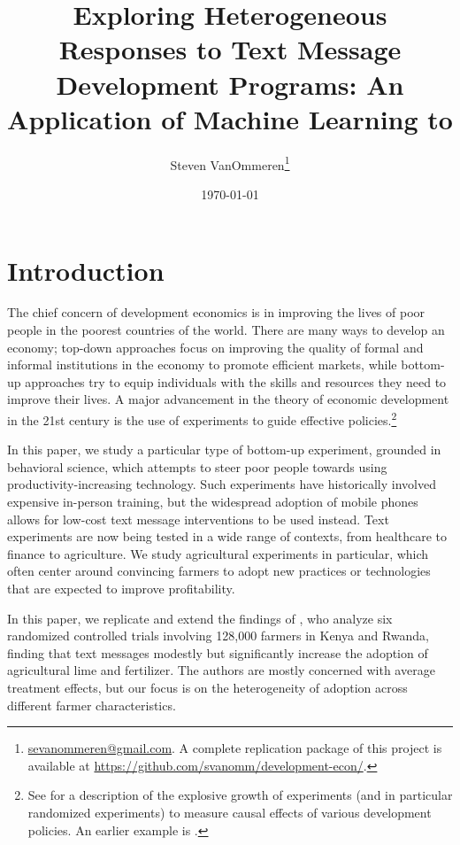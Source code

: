 \documentclass[12pt]{article}
\begin{document}
\title{Exploring Heterogeneous Responses to Text Message Development Programs: An Application of Machine Learning to \textcite{fabregas_digital_2025}}
\author{Steven VanOmmeren\thanks{\href{mailto:sevanommeren@gmail.com}{sevanommeren@gmail.com}. A complete replication package of this project is available at \url{https://github.com/svanomm/development-econ/}.}}
\date{\today}
\maketitle
\noindent
\small
\tableofcontents
\newpage

\doublespacing
\normalsize

\section{Introduction}

The chief concern of development economics is in improving the lives of poor people in the poorest countries of the world. There are many ways to develop an economy; top-down approaches focus on improving the quality of formal and informal institutions in the economy to promote efficient markets, while bottom-up approaches try to equip individuals with the skills and resources they need to improve their lives. A major advancement in the theory of economic development in the 21st century is the use of experiments to guide effective policies.\footnote{See \textcite{basu_influence_2020} for a description of the explosive growth of experiments (and in particular randomized experiments) to measure causal effects of various development policies. An earlier example is \textcite{duflo_use_2003}.} 

In this paper, we study a particular type of bottom-up experiment, grounded in behavioral science, which attempts to steer poor people towards using productivity-increasing technology. Such experiments have historically involved expensive in-person training, but the widespread adoption of mobile phones allows for low-cost text message interventions to be used instead. Text experiments are now being tested in a wide range of contexts, from healthcare to finance to agriculture. We study agricultural experiments in particular, which often center around convincing farmers to adopt new practices or technologies that are expected to improve profitability.

In this paper, we replicate and extend the findings of \textcite{fabregas_digital_2025}, who analyze six randomized controlled trials involving 128,000 farmers in Kenya and Rwanda, finding that text messages modestly but significantly increase the adoption of agricultural lime and fertilizer. The authors are mostly concerned with average treatment effects, but our focus is on the heterogeneity of adoption across different farmer characteristics.
\end{document}
